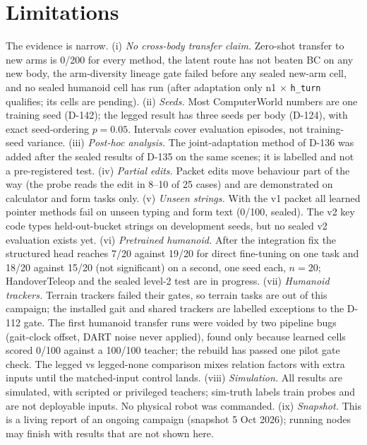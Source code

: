 \documentclass[10pt,twocolumn]{article}
\begin{document}
\section{Limitations}\label{sec:limitations}
The evidence is narrow. (i) \emph{No cross-body transfer claim.} Zero-shot transfer to new arms is 0/200 for every method, the latent route has not beaten BC on any new body, the arm-diversity lineage gate failed before any sealed new-arm cell, and no sealed humanoid cell has run (after adaptation only n1 $\times$ \texttt{h\_turn} qualifies; its cells are pending). (ii) \emph{Seeds.} Most ComputerWorld numbers are one training seed (D-142); the legged result has three seeds per body (D-124), with exact seed-ordering $p{=}0.05$. Intervals cover evaluation episodes, not training-seed variance. (iii) \emph{Post-hoc analysis.} The joint-adaptation method of D-136 was added after the sealed results of D-135 on the same scenes; it is labelled and not a pre-registered test. (iv) \emph{Partial edits.} Packet edits move behaviour part of the way (the probe reads the edit in 8--10 of 25 cases) and are demonstrated on calculator and form tasks only. (v) \emph{Unseen strings.} With the v1 packet all learned pointer methods fail on unseen typing and form text (0/100, sealed). The v2 key code types held-out-bucket strings on development seeds, but no sealed v2 evaluation exists yet. (vi) \emph{Pretrained humanoid.} After the integration fix the structured head reaches 7/20 against 19/20 for direct fine-tuning on one task and 18/20 against 15/20 (not significant) on a second, one seed each, $n{=}20$; HandoverTeleop and the sealed level-2 test are in progress. (vii) \emph{Humanoid trackers.} Terrain trackers failed their gates, so terrain tasks are out of this campaign; the installed gait and shared trackers are labelled exceptions to the D-112 gate. The first humanoid transfer runs were voided by two pipeline bugs (gait-clock offset, DART noise never applied), found only because learned cells scored 0/100 against a 100/100 teacher; the rebuild has passed one pilot gate check. The legged vs legged-none comparison mixes relation factors with extra inputs until the matched-input control lands. (viii) \emph{Simulation.} All results are simulated, with scripted or privileged teachers; sim-truth labels train probes and are not deployable inputs. No physical robot was commanded. (ix) \emph{Snapshot.} This is a living report of an ongoing campaign (snapshot 5 Oct 2026); running nodes may finish with results that are not shown here.
\end{document}
